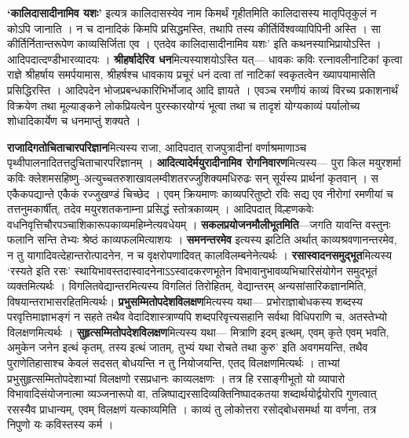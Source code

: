 \documentclass[10pt, a5paper, twoside]{article}
\begin{document}
\textbf{‘कालिदासादीनामिव यशः’} इत्यत्र कालिदासस्येव नाम किमर्थं गृहीतमिति कालिदासस्य मातृपितृकुलं न कोऽपि जानाति । न च दानादिकं किमपि प्रसिद्धमस्ति, तथापि तस्य कीर्तिर्विश्वव्यापिपिनी  अस्ति । सा कीर्तिर्नितान्तरूपेण काव्यसिर्जिता एव । एतदेव कालिदासादीनामिव यशः’ इति कथनस्याभिप्रायोऽस्ति । आदिपदात्दण्डीभारव्यादयः । 	\textbf{श्रीहर्षादेरिव धन}मित्यस्याशयोऽस्ति यत्— धावकः कविः रत्नावलीनाटिकां कृत्वा राज्ञे श्रीहर्षाय समर्पयामास, श्रीहर्षश्च धावकाय प्रचूरं धनं दत्वा तां नाटिकां  स्वकृतत्वेन ख्यापयामासेति प्रसिद्धिरस्ति । आदिपदेन भोजप्रबन्धकारिभिर्भोजाद्  आदि ज्ञायते । एवञ्च रमणीयं काव्यं विरच्य प्रकाशनार्थं विक्रयेण तथा मूल्याङ्कने लोकप्रियत्वेन पुरस्कारयोग्यं भूत्वा तथा च तादृशं योग्यकाव्यं पर्यालोच्य शोधादिकार्येण च धनमाप्तुं शक्यते ।

\textbf{राजादिगतोचिताचारपरिज्ञान}मित्यस्य राजा, आदिपदात् राजपुत्रादीनां वर्णाश्रमाणाञ्च पृथ्वीपालनादितत्तदुचिताचारपरिज्ञानम् । \textbf{आदित्यादेर्मयुरादीनामिव रोगनिवारण}मित्यस्य— पुरा किल मयुरशर्मा कविः क्लेशमसहिष्णु–अत्युच्चतरुशाखावलम्वीशतरज्जुशिक्यमधिरुढः सन् सूर्यस्य प्रार्थनां कृतवान् । स एकैकपद्यान्ते एकैकं रज्जुखण्डं चिच्छेद । एवम् क्रियमाणः काव्यपरितुष्टो रविः सद्य एव नीरोगां रमणीयां च तत्तनुमकार्षीत्, तदेव मयुरशतकनाम्ना प्रसिद्धं स्तोत्रकाव्यम् । आदिपदात् विल्हणकवेः वधनिवृत्तिचौरपञ्चाशिकारूपकाव्यमहिम्नेत्यवधेयम् । 	\textbf{सकलप्रयोजनमौलीभूतमिति}—जगति यावन्ति वस्तुनः फलानि सन्ति तेभ्यः श्रेष्ठं काव्यफलमित्याशयः । \textbf{समनन्तरमेव} इत्यस्य झटिति अर्थात् काव्यश्रवणानन्तरमेव, न तु यागादिवत्देहान्तरोत्पादनेन, न च वृक्षरोपणादिवत् कालविलम्बनेनेत्यर्थः । 	\textbf{रसास्वादनसमुद्भूत}मित्यस्य ‘रस्यते इति रसः’ स्थायिभावस्तदास्वादनेनाऽऽस्वादकरणभूतेन विभावानुभावव्यभिचारिसंयोगेन समुद्भूतं व्यक्तमित्यर्थः । 	विगलितवेद्यान्तरमित्यस्य विगलितं तिरोहितम्, वेद्यान्तरम् अन्यसांसारिकज्ञानमिति, विषयान्तराभासरहितमित्यर्थः। 	\textbf{प्रभुसम्मितोपदेशविलक्षण}मित्यस्य यथा— प्रभोराज्ञाबोधकस्य शब्दस्य परवृत्तिमाज्ञाभङ्गं न सहते तथैव वेदादिशास्त्राण्यपि शब्दपरिवृत्त्यसहानि सर्वथा विधिपराणि च, अतस्तेभ्यो विलक्षणमित्यर्थः । 	\textbf{सुहृत्सम्मितोपदेशविलक्षण}मित्यस्य यथा— मित्राणि इदम् इत्थम्, एवम् कृते एवम् भवति, अमुकेन जनेन इत्थं कृतम्, तस्य इत्थं जातम्, तुभ्यं यथा रोचते तथा कुरु’ इति अवगमयन्ति, तथैव पुराणेतिहासाश्च केवलं सदसत् बोधयन्ति न तु नियोजयन्ति, एतद् विलक्षणमित्यर्थः । ताभ्यां प्रभुसुहृत्सम्मितोपदेशाभ्यां विलक्षणो रसप्रधानः काव्यलक्षणः । तत्र हि रसाङ्गीभूतो यो व्यापारो विभावादिसंयोजनात्मा व्यञ्जनारूपो वा, तन्निष्पाद्यरसादिव्यक्तिनिष्पादकतया शब्दार्थयोर्द्वयोरपि गुणत्वात् रसस्यैव प्राधान्यम्, एवम् विलक्षणं यत्काव्यमिति । काव्यं तु लोकोत्तरा रसोद्बोधसमर्था या वर्णना, तत्र निपुणो यः कविस्तस्य कर्म ।
\end{document}
